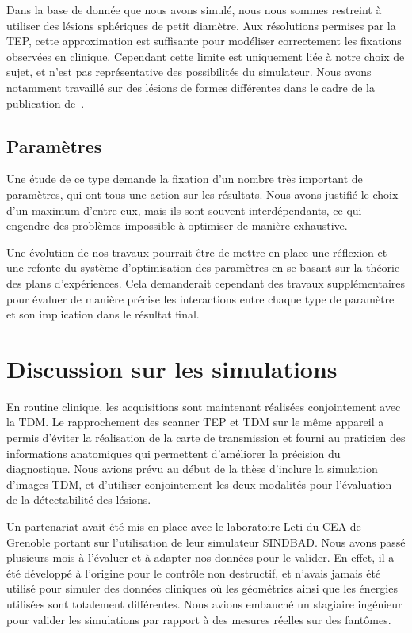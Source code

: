 Dans la base de donnée que nous avons simulé, nous nous sommes restreint à utiliser des lésions sphériques de petit diamètre. Aux résolutions permises par la TEP, cette approximation est suffisante pour modéliser correctement les fixations observées en clinique. Cependant cette limite est uniquement liée à notre choix de sujet, et n'est pas représentative des possibilités du simulateur. Nous avons notamment travaillé sur des lésions de formes différentes dans le cadre de la publication de~\cite{le2009incorporating}. 


\subsection{Paramètres}

Une étude de ce type demande  la fixation d'un nombre très important de paramètres, qui ont tous une action sur les résultats. Nous avons justifié le choix d'un maximum d'entre eux, mais ils sont souvent interdépendants, ce qui engendre des problèmes impossible à optimiser de manière exhaustive. 

Une évolution de nos travaux pourrait être de mettre en place une réflexion et une refonte du système d'optimisation des paramètres en se basant sur la théorie des plans d'expériences. Cela demanderait cependant des travaux supplémentaires pour évaluer de manière précise les interactions entre chaque type de paramètre et son implication dans le résultat final.

\section{Discussion sur les simulations}

En routine clinique, les acquisitions sont maintenant réalisées conjointement avec la TDM. Le rapprochement des scanner TEP et TDM sur le même appareil a permis d'éviter la réalisation de la carte de transmission et fourni au praticien des informations anatomiques qui permettent d'améliorer la précision du diagnostique. Nous avions prévu au début de la thèse d'inclure la simulation d'images TDM, et d'utiliser conjointement les deux modalités pour l'évaluation de la détectabilité des lésions. 

Un partenariat avait été mis en place avec le laboratoire Leti du CEA de Grenoble portant sur l'utilisation de leur simulateur SINDBAD. Nous avons passé plusieurs mois à l'évaluer et à adapter nos données pour le valider. En effet, il a été développé à l'origine pour le contrôle non destructif, et n'avais jamais été utilisé pour simuler des données cliniques où les géométries ainsi que les énergies utilisées sont totalement différentes. Nous avions embauché un stagiaire ingénieur pour valider les simulations par rapport à des mesures réelles sur des fantômes. 

